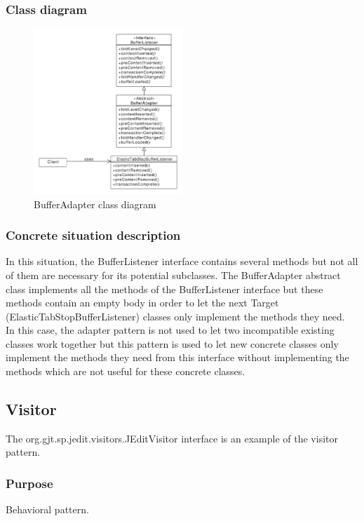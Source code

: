\documentclass[a4paper,10pt]{article}
\begin{document}
\subsubsection{Class diagram}
\begin{center}
\begin{figure}[h]
  \centerline{\includegraphics[width=0.5\textwidth]{adapter-bufferadapter-class-diagram.pdf}}
  \caption{BufferAdapter class diagram}
\end{figure}
\end{center}
\subsubsection{Concrete situation description}
In this situation, the BufferListener interface contains several methods but not all of them are necessary for its potential subclasses. The BufferAdapter abstract class implements all the methods of the BufferListener interface but these methods contain an empty body in order to let the next Target (ElasticTabStopBufferListener) classes only implement the methods they need.\\
In this case, the adapter pattern is not used to let two incompatible existing classes work together but this pattern is used to let new concrete classes only implement the methods they need from this interface without implementing the methods which are not useful for these concrete classes.

\subsection{Visitor}
The org.gjt.sp.jedit.visitors.JEditVisitor interface is an example of the visitor pattern.
\subsubsection{Purpose}
Behavioral pattern.
\end{document}

